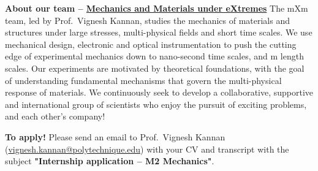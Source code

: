 \documentclass[a4paper,11pt,fleqn]{article}
\begin{document}
	\begin{myhlbox}{\textbf{About our team -- \href{https://vigneshkannan-group.github.io/vk-mxm-website/}{Mechanics and Materials under eXtremes}}}
		The mXm team, led by Prof.~Vignesh Kannan, studies the mechanics of materials and structures under large stresses, multi-physical fields and short time scales. We use mechanical design, electronic and optical instrumentation to push the cutting edge of experimental mechanics down to nano-second time scales, and \textmu m length scales. Our experiments are motivated by theoretical foundations, with the goal of understanding fundamental mechanisms that govern the multi-physical response of materials. We continuously seek to develop a collaborative, supportive and international group of scientists who enjoy the pursuit of exciting problems, and each other's company!
	\end{myhlbox}

	\begin{myhlbox}{\textbf{To apply!}}
		Please {send an email} to {Prof.~Vignesh Kannan} (\href{mailto:vignesh.kannan@polytechnique.edu}{vignesh.kannan@polytechnique.edu}) with your CV and transcript with the subject \textbf{"Internship application -- M2 Mechanics"}.
	\end{myhlbox}
\end{document}
